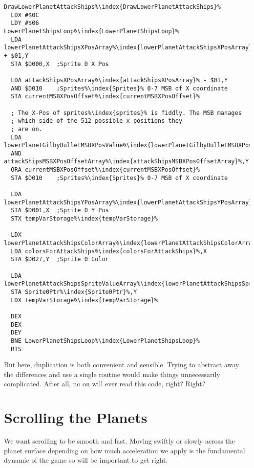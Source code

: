 \begin{minipage}[b]{0.50\linewidth}
\centering
\begin{lstlisting}[basicstyle=\tiny\ttfamily,escapechar=\%]
DrawLowerPlanetAttackShips%\index{DrawLowerPlanetAttackShips}%
  LDX #$0C
  LDY #$06
LowerPlanetShipsLoop%\index{LowerPlanetShipsLoop}%   
  LDA lowerPlanetAttackShipsXPosArray%\index{lowerPlanetAttackShipsXPosArray}% + $01,Y
  STA $D000,X  ;Sprite 0 X Pos

  LDA attackShipsXPosArray%\index{attackShipsXPosArray}% - $01,Y
  AND $D010    ;Sprites%\index{Sprites}% 0-7 MSB of X coordinate
  STA currentMSBXPosOffset%\index{currentMSBXPosOffset}%

  ; The X-Pos of sprites%\index{sprites}% is fiddly. The MSB manages
  ; which side of the 512 possible x positions they
  ; are on.
  LDA lowerPlanetGilbyBulletMSBXPosValue%\index{lowerPlanetGilbyBulletMSBXPosValue}%,Y
  AND attackShipsMSBXPosOffsetArray%\index{attackShipsMSBXPosOffsetArray}%,Y
  ORA currentMSBXPosOffset%\index{currentMSBXPosOffset}%
  STA $D010    ;Sprites%\index{Sprites}% 0-7 MSB of X coordinate

  LDA lowerPlanetAttackShipsYPosArray%\index{lowerPlanetAttackShipsYPosArray}%,Y
  STA $D001,X  ;Sprite 0 Y Pos
  STX tempVarStorage%\index{tempVarStorage}%

  LDX lowerPlanetAttackShipsColorArray%\index{lowerPlanetAttackShipsColorArray}%,Y
  LDA colorsForAttackShips%\index{colorsForAttackShips}%,X
  STA $D027,Y  ;Sprite 0 Color

  LDA lowerPlanetAttackShipsSpriteValueArray%\index{lowerPlanetAttackShipsSpriteValueArray}%,Y
  STA Sprite0Ptr%\index{Sprite0Ptr}%,Y
  LDX tempVarStorage%\index{tempVarStorage}%

  DEX
  DEX
  DEY
  BNE LowerPlanetShipsLoop%\index{LowerPlanetShipsLoop}%
  RTS
\end{lstlisting}
\end{minipage}

But here, duplication is both convenient and sensible. Trying
to abstract away the differences and use a single routine would make things unnecessarily complicated. After all, no
on will ever read this code, right? Right?


\section{Scrolling the Planets}
We want scrolling to be smooth and fast. Moving swiftly or slowly across the planet surface
depending on how much acceleration we apply is the fundamental dynamic of the game so will
be important to get right.

